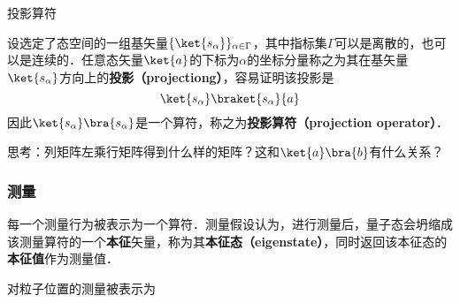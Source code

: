 \begin{example}{投影算符}

设选定了态空间的一组基矢量$\{\ket{s_\alpha}\}_{\alpha\in \Gamma}$，其中指标集$\Gamma$可以是离散的，也可以是连续的．任意态矢量$\ket{a}$的下标为$\alpha$的坐标分量称之为其在基矢量$\ket{s_\alpha}$方向上的\textbf{投影（projectiong）}，容易证明该投影是
\begin{equation}
\ket{s_\alpha}\braket{s_\alpha}{a}
\end{equation}
因此$\ket{s_\alpha}\bra{s_\alpha}$是一个算符，称之为\textbf{投影算符（projection operator）}．

思考：列矩阵左乘行矩阵得到什么样的矩阵？这和$\ket{a}\bra{b}$有什么关系？

\end{example}



\subsubsection{测量}

每一个测量行为被表示为一个算符．测量假设认为，进行测量后，量子态会坍缩成该测量算符的一个\textbf{本征}矢量，称为其\textbf{本征态（eigenstate）}，同时返回该本征态的\textbf{本征值}作为测量值．

\begin{example}{}
对粒子位置的测量被表示为
\end{example}











































